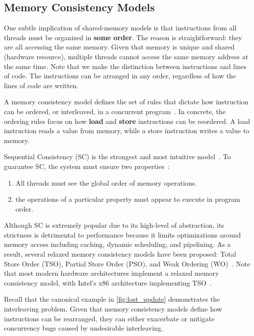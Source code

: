 \subsection{Memory Consistency Models}
One subtle implication of shared-memory models is that instructions
from all threads must be organized in \textbf{some order}. The reason is straightforward:
they are all accessing the same memory. Given that memory is unique and shared (hardware resource),
multiple threads cannot access the same memory address at the same time. Note that
we make the distinction between instructions and lines of code. The instructions
can be arranged in any order, regardless of how the lines of code are written.

A memory consistency model defines the set of rules that dictate how
instruction can be ordered, or interleaved, in a concurrent
program~\cite{bornholt2016memoryModels,jaffe2011impactOfMemoryModels}.
In concrete, the ordering rules focus on how \textbf{load} and \textbf{store} instructions
can be reordered. A load instruction reads a value from memory,
while a store instruction writes a value to memory.

Sequential Consistency (SC) is the strongest
and most intuitive model~\cite{lamport1979multiprocessor}.
To guarantee SC, the system must ensure two properties~\cite{jaffe2011impactOfMemoryModels}:
\begin{enumerate}
    \item All threads must see the global order of memory operations.
    \item the operations of a particular property must appear to execute
    in program order.
\end{enumerate}

Although SC is extremely popular due to its high-level of abstraction,
its strictness is detrimental to performance because it limits
optimizations around memory access including caching,
dynamic scheduling, and pipelining. As a result, several relaxed
memory consistency models have been proposed:
Total Store Order (TSO), Partial Store Order (PSO),
and Weak Ordering (WO)~\cite{jaffe2011impactOfMemoryModels}.
Note that most modern hardware architectures implement a relaxed
memory consistency model, with Intel's x86 architecture implementing TSO~\cite{cox2021hardwareMemoryModels}.

Recall that the canonical example in \autoref{fig:lost_update}
demonstrates the interleaving problem. Given that memory
consistency models define how instructions can be rearranged,
they can either exacerbate or mitigate concurrency bugs
caused by undesirable interleaving.

